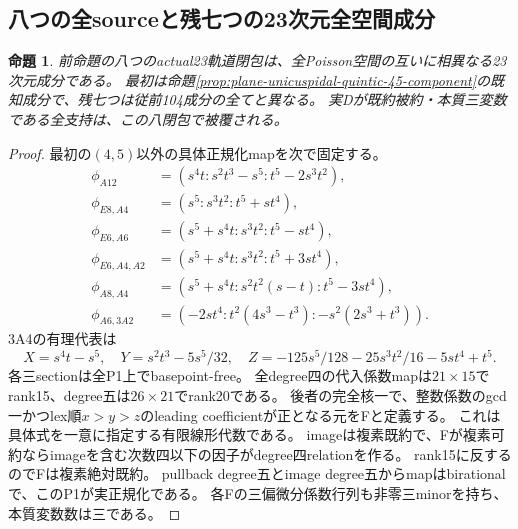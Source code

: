 \documentclass[a4paper,11pt]{ltjsarticle}
\newtheorem{proposition}{命題}[section]
\theoremstyle{definition}
\begin{document}
\subsection{八つの全sourceと残七つの23次元全空間成分}
\begin{proposition}\label{prop:essential-three-eight-components}
前命題の八つのactual23軌道閉包は、全Poisson空間の互いに相異なる23次元成分である。
最初は命題\ref{prop:plane-unicuspidal-quintic-45-component}の既知成分で、残七つは従前104成分の全てと異なる。
実Dが既約被約・本質三変数である全支持は、この八閉包で被覆される。
\end{proposition}
\begin{proof}
最初の$(4,5)$以外の具体正規化mapを次で固定する。
\[
\begin{aligned}
 \phi_{A12}&=(s^4t:s^2t^3-s^5:t^5-2s^3t^2),\\
 \phi_{E8,A4}&=(s^5:s^3t^2:t^5+st^4),\\
 \phi_{E6,A6}&=(s^5+s^4t:s^3t^2:t^5-st^4),\\
 \phi_{E6,A4,A2}&=(s^5+s^4t:s^3t^2:t^5+3st^4),\\
 \phi_{A8,A4}&=(s^5+s^4t:s^2t^2(s-t):t^5-3st^4),\\
 \phi_{A6,3A2}&=(-2st^4:t^2(4s^3-t^3):-s^2(2s^3+t^3)).
\end{aligned}
\]
3A4の有理代表は
\[
 X=s^4t-s^5,\quad Y=s^2t^3-5s^5/32,
 \quad Z=-125s^5/128-25s^3t^2/16-5st^4+t^5.
\]
各三sectionは全P1上でbasepoint-free。
全degree四の代入係数mapは$21\times15$でrank15、degree五は$26\times21$でrank20である。
後者の完全核一で、整数係数のgcd一かつlex順$x>y>z$のleading coefficientが正となる元をFと定義する。
これは具体式を一意に指定する有限線形代数である。
imageは複素既約で、Fが複素可約ならimageを含む次数四以下の因子がdegree四relationを作る。
rank15に反するのでFは複素絶対既約。
pullback degree五とimage degree五からmapはbirationalで、このP1が実正規化である。
各Fの三偏微分係数行列も非零三minorを持ち、本質変数数は三である。


\end{proof}
\end{document}
